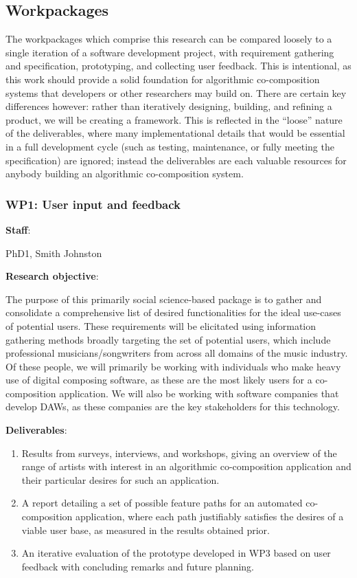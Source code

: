 \documentclass[11pt]{article}
\begin{document}
	\subsection{Workpackages}
	
	The workpackages which comprise this research can be compared loosely to a single iteration of a software development project, with requirement gathering and specification, prototyping, and collecting user feedback. This is intentional, as this work should provide a solid foundation for algorithmic co-composition systems that developers or other researchers may build on. There are certain key differences however: rather than iteratively designing, building, and refining a product, we will be creating a framework. This is reflected in the ``loose'' nature of the deliverables, where many implementational details that would be essential in a full development cycle (such as testing, maintenance, or fully meeting the specification) are ignored; instead the deliverables are each valuable resources for anybody building an algorithmic co-composition system.
	
	\subsubsection*{WP1: User input and feedback}
	
	\noindent \textbf{Staff}:
	\smallskip
	
	PhD1, Smith Johnston
	
	\noindent \textbf{Research objective}:
	\smallskip
	
	The purpose of this primarily social science-based package is to gather and consolidate a comprehensive list of desired functionalities for the ideal use-cases of potential users. These requirements will be elicitated using information gathering methods broadly targeting the set of potential users, which include professional musicians/songwriters from across all domains of the music industry. Of these people, we will primarily be working with individuals who make heavy use of digital composing software, as these are the most likely users for a co-composition application. We will also be working with software companies that develop DAWs, as these companies are the key stakeholders for this technology.
	
	\bigskip
	\noindent \textbf{Deliverables}:
	\begin{enumerate}
		\item Results from surveys, interviews, and workshops, giving an overview of the range of artists with interest in an algorithmic co-composition application and their particular desires for such an application.
		\item A report detailing a set of possible feature paths for an automated co-composition application, where each path justifiably satisfies the desires of a viable user base, as measured in the results obtained prior.
		\item An iterative evaluation of the prototype developed in WP3 based on user feedback with concluding remarks and future planning.
	\end{enumerate}
	
\end{document}
